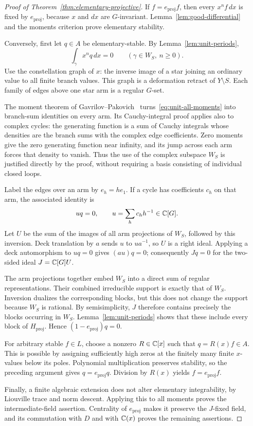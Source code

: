\begin{proof}[Proof of Theorem~\ref{thm:elementary-projective}]
If $f=e_{\mathrm{proj}}f$, then every $x^n f\,dx$ is fixed by
$e_{\mathrm{proj}}$, because $x$ and $dx$ are $G$-invariant.
Lemma~\ref{lem:good-differential} and the moments criterion prove
elementary stability.

Conversely, first let $q\in A$ be elementary-stable.  By
Lemma~\ref{lem:unit-periods},
\begin{equation}
 \int_\gamma x^n q\,dx=0
 \qquad(\gamma\in W_S,\ n\geq0).
 \label{eq:unit-all-moments}
\end{equation}
Use the constellation graph of $x$: the inverse image of a star joining
an ordinary value to all finite branch values.  This graph is a
deformation retract of $Y\setminus S$.  Each family of edges above one
star arm is a regular $G$-set.

The moment theorem of Gavrilov--Pakovich~\cite[Theorem~2.1 and
formula~(15)]{GP2014} turns~\eqref{eq:unit-all-moments} into branch-sum
identities on every arm.  Its Cauchy-integral proof applies also to
complex cycles: the generating function is a sum of Cauchy integrals
whose densities are the branch sums with the complex edge coefficients.
Zero moments give the zero generating function near infinity, and its
jump across each arm forces that density to vanish.  Thus the use of
the complex subspace $W_S$ is justified directly by the proof, without
requiring a basis consisting of individual closed loops.

Label the edges over an arm by $e_h=h e_1$.  If a cycle has coefficients
$c_h$ on that arm, the associated identity is
\[
 u q=0,
 \qquad u=\sum_h c_h h^{-1}\in\mathbb C[G].
\]
Let $U$ be the sum of the images of all arm projections of $W_S$,
followed by this inversion.  Deck translation by $a$ sends $u$ to
$ua^{-1}$, so $U$ is a right ideal.  Applying a deck automorphism to
$uq=0$ gives $(au)q=0$; consequently $Jq=0$ for the two-sided ideal
$J=\mathbb C[G]U$.

The arm projections together embed $W_S$ into a direct sum of regular
representations.  Their combined irreducible support is exactly that
of $W_S$.  Inversion dualizes the corresponding blocks, but this does
not change the support because $W_S$ is rational.  By semisimplicity,
$J$ therefore contains precisely the blocks occurring in $W_S$.
Lemma~\ref{lem:unit-periods} shows that these include every block of
$H_{\mathrm{proj}}$.  Hence $(1-e_{\mathrm{proj}})q=0$.

For arbitrary stable $f\in L$, choose a nonzero $R\in\mathbb C[x]$ such
that $q=R(x)f\in A$.  This is possible by assigning sufficiently high
zeros at the finitely many finite $x$-values below its poles.  Polynomial
multiplication preserves stability, so the preceding argument gives
$q=e_{\mathrm{proj}}q$.  Division by $R(x)$ yields
$f=e_{\mathrm{proj}}f$.

Finally, a finite algebraic extension does not alter elementary
integrability, by Liouville trace and norm descent.  Applying this to
all moments proves the intermediate-field assertion.  Centrality of
$e_{\mathrm{proj}}$ makes it preserve the $J$-fixed field, and its
commutation with $D$ and with $\mathbb C(x)$ proves the remaining assertions.
\end{proof}

